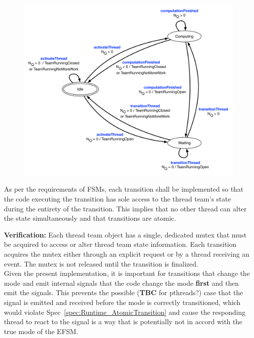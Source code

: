 \documentclass{article}
\begin{document}
\begin{figure}[!hp]
\begin{center}
\includegraphics[width=6.5in]{ThreadStatesPersistent.pdf}
\caption[]{}
\label{fig:ThreadStateDiagram}
\end{center}
\end{figure}

\begin{spec}
\label{spec:Runtime_AtomicTransition}
As per the requirements of FSMs, each transition shall be implemented so that
the code executing the transition has sole access to the thread team's state
during the entirety of the transition.  This implies that no other thread can
alter the state simultaneously and that transitions are atomic.
\end{spec}
\textbf{Verification:}\hspace{0.125in}  Each thread team object has a single,
dedicated mutex that must be acquired to access or alter thread team state
information.  Each transition acquires the mutex either through an explicit
request or by a thread receiving an event.  The mutex is not released until
the transition is finalized.\\

Given the present implementation, it is important for transitions that
change the mode and emit internal signals that the code change the mode
\textbf{first} and then emit the signals.  This prevents the possible
(\textbf{TBC} for pthreads?) case that the signal is emitted and received before
the mode is correctly transitioned, which would violate
Spec~\ref{spec:Runtime_AtomicTransition} and cause the responding thread
to react to the signal is a way that is potentially not in accord with the true
mode of the EFSM.
\end{document}
